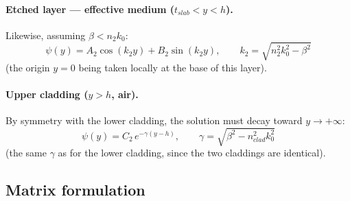 \documentclass[a4paper,11pt]{report}
\begin{document}
\paragraph{Etched layer --- effective medium ($t_{slab}<y<h$).} Likewise, assuming $\beta<n_2k_0$:
\begin{equation}
\psi(y) = A_2\cos(k_2y) + B_2\sin(k_2y), \qquad k_2=\sqrt{n_2^2k_0^2-\beta^2}
\end{equation}
(the origin $y=0$ being taken locally at the base of this layer).

\paragraph{Upper cladding ($y>h$, air).} By symmetry with the lower cladding, the solution must decay toward $y\to+\infty$:
\begin{equation}
\psi(y) = C_2\,e^{-\gamma(y-h)}, \qquad \gamma = \sqrt{\beta^2-n_{clad}^2k_0^2}
\end{equation}
(the same $\gamma$ as for the lower cladding, since the two claddings are identical).

\subsection*{Matrix formulation}
\end{document}
